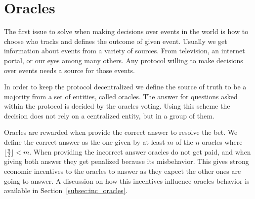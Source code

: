 \section{Oracles}

The first issue to solve when making decisions over events in the world is how
  to choose who tracks and defines the outcome of given event.
Usually we get information about events from a variety of sources.
From television, an internet portal, or our eyes among many others. Any protocol
  willing to make decisions over events needs a source for those events.

In order to keep the protocol decentralized we define the source of truth to be
  a majority from a set of entities, called oracles.
The answer for questions asked within the protocol is decided by the oracles
  voting.
Using this scheme the decision does not rely on a centralized entity, but in a
  group of them.

Oracles are rewarded when provide the correct answer to resolve the bet.
We define the correct answer as the one given by at least $m$ of the $n$ oracles
  where $\lfloor \frac{n}{2} \rfloor < m$.
When providing the incorrect answer oracles do not get paid, and when giving
  both answer they get penalized because its misbehavior. This gives strong
  economic incentives to the oracles to answer as they expect the other ones
  are going to answer.
A discussion on how this incentives influence oracles behavior is available
  in Section~\ref{subsec:inc_oracles}.
